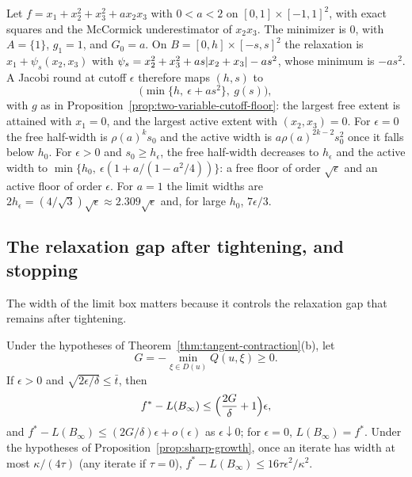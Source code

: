 \begin{example}\label{ex:boundary}
Let $f=x_1+x_2^2+x_3^2+ax_2x_3$ with $0<a<2$ on $[0,1]\times[-1,1]^2$, with
exact squares and the McCormick underestimator of $x_2x_3$. The minimizer
is $0$, with $A=\{1\}$, $g_1=1$, and $G_0=a$. On $B=[0,h]\times[-s,s]^2$ the
relaxation is $x_1+\psi_s(x_2,x_3)$ with
$\psi_s=x_2^2+x_3^2+as\lvert x_2+x_3\rvert-as^2$, whose minimum is $-as^2$. A Jacobi
round at cutoff $\epsilon$ therefore maps $(h,s)$ to
\[
  \bigl(\min\{h,\ \epsilon+as^2\},\ g(s)\bigr),
\]
with $g$ as in Proposition~\ref{prop:two-variable-cutoff-floor}: the
largest free extent is attained with $x_1=0$, and the largest active extent
with $(x_2,x_3)=0$. For $\epsilon=0$ the free half-width is $\rho(a)^ks_0$ and
the active width is $a\rho(a)^{2k-2}s_0^2$ once it falls below $h_0$. For
$\epsilon>0$ and $s_0\ge h_\epsilon$, the free half-width decreases to
$h_\epsilon$ and the active width to
$\min\{h_0,\ \epsilon(1+a/(1-a^2/4))\}$: a free floor of order $\sqrt\epsilon$
and an active floor of order $\epsilon$. For $a=1$ the limit widths are
$2h_\epsilon=(4/\sqrt3)\sqrt\epsilon\approx2.309\sqrt\epsilon$ and, for large
$h_0$, $7\epsilon/3$.
\end{example}

\subsection{The relaxation gap after tightening, and stopping}\label{sec:local-rates-consequences}

The width of the limit box matters because it controls the relaxation gap
that remains after tightening.

\begin{corollary}\label{cor:local-gap}
Under the hypotheses of Theorem~\ref{thm:tangent-contraction}(b), let
\[
  G=-\min_{\xi\in D(u)}Q(u,\xi)\ge0.
\]
If $\epsilon>0$ and $\sqrt{2\epsilon/\delta}\le\bar t$, then
\[
  f^*-L(B_\infty)\le\Bigl(\frac{2G}{\delta}+1\Bigr)\epsilon,
\]
and $f^*-L(B_\infty)\le(2G/\delta)\epsilon+o(\epsilon)$ as $\epsilon\downarrow0$;
for $\epsilon=0$, $L(B_\infty)=f^*$. Under the hypotheses of
Proposition~\ref{prop:sharp-growth}, once an iterate has width at most
$\kappa/(4\tau)$ (any iterate if $\tau=0$),
$f^*-L(B_\infty)\le16\tau\epsilon^2/\kappa^2$.
\end{corollary}


